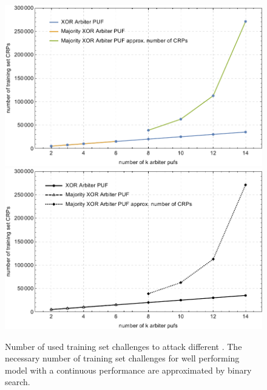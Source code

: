 
\vspace{0.25cm}
\begin{figure}[ht]
\ifx{}\undefined
{}
\else
	\if{}
	\centering
	\includegraphics[width=1.00\textwidth]{images/xor-cma-attack-crps.pdf}
	\else
	\includegraphics[width=1.00\textwidth]{images/xor-cma-attack-crps_mono.pdf}
	\fi
\fi
\caption[Number of used training set challenges]{Number of used training set challenges to attack different \pufs. The necessary number of training set challenges for well performing model with a continuous performance are approximated by binary search.}
\label{fig:cmamultiattackrequiredcrp}
\end{figure}

